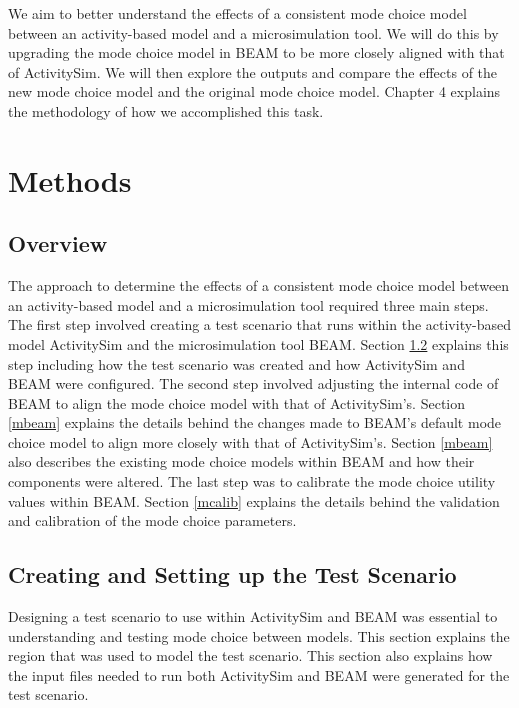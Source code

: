 \documentclass[12pt, oneside, openright]{byuthesis}
\begin{document}
We aim to better understand the effects of a consistent mode choice model between an activity-based model and a microsimulation tool. We will do this by upgrading the mode choice model in BEAM to be more closely aligned with that of ActivitySim. We will then explore the outputs and compare the effects of the new mode choice model and the original mode choice model. Chapter 4 explains the methodology of how we accomplished this task.

\hypertarget{methods}{%
\chapter{Methods}\label{methods}}

\hypertarget{overview-1}{%
\section{Overview}\label{overview-1}}

The approach to determine the effects of a consistent mode choice model between an activity-based model and a microsimulation tool required three main steps. The first step involved creating a test scenario that runs within the activity-based model ActivitySim and the microsimulation tool BEAM. Section \ref{mscen} explains this step including how the test scenario was created and how ActivitySim and BEAM were configured. The second step involved adjusting the internal code of BEAM to align the mode choice model with that of ActivitySim's. Section \ref{mbeam} explains the details behind the changes made to BEAM's default mode choice model to align more closely with that of ActivitySim's. Section \ref{mbeam} also describes the existing mode choice models within BEAM and how their components were altered. The last step was to calibrate the mode choice utility values within BEAM. Section \ref{mcalib} explains the details behind the validation and calibration of the mode choice parameters.

\hypertarget{mscen}{%
\section{Creating and Setting up the Test Scenario}\label{mscen}}

Designing a test scenario to use within ActivitySim and BEAM was essential to understanding and testing mode choice between models. This section explains the region that was used to model the test scenario. This section also explains how the input files needed to run both ActivitySim and BEAM were generated for the test scenario.
\end{document}

